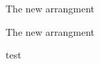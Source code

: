 \documentclass{beamer}
\newcommand{\floattitle}[1]{%
    \begin{beamercolorbox}[sep=0.3cm,left,wd=\paperwidth]{frametitle}
     \usebeamerfont{frametitle}%
     \vbox{}\vskip-1ex%
     \strut#1\strut\par%
     \vskip-1ex%
    \end{beamercolorbox}%
}
\begin{document}
\begin{frame}
The new arrangment
\end{frame}

\begin{frame}[allowframebreaks]
The new arrangment

\framebreak

test
\end{frame}
\end{document}
